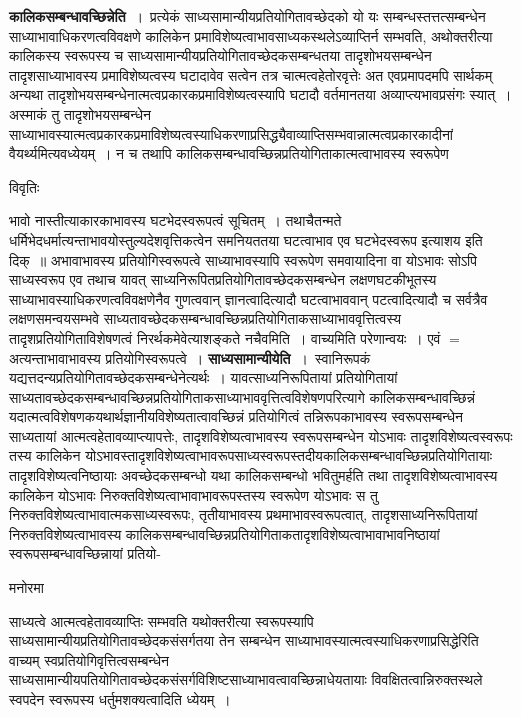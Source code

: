 \documentclass[10pt, openany]{book}
\begin{document}
{\textbf {\qt कालिकसम्बन्धावच्छिन्नेति~}।~प्रत्येकं साध्यसामान्यीयप्रतियोगितावच्छेदको यो यः सम्बन्धस्तत्तत्सम्बन्धेन साध्याभावाधिकरणत्वविवक्षणे कालिकेन प्रमाविशेष्यत्वाभावसाध्यकस्थलेऽव्याप्तिर्न सम्भवति, अथोक्तरीत्या कालिकस्य स्वरूपस्य च साध्यसामान्यीयप्रतियोगितावच्छेदकसम्बन्धतया तादृशोभयसम्बन्धेन तादृशसाध्याभावस्य प्रमाविशेष्यत्वस्य घटादावेव सत्वेन तत्र चात्मत्वहेतोरवृत्तेः अत एवप्रमापदमपि सार्थकम् अन्यथा तादृशोभयसम्बन्धेनात्मत्वप्रकारकप्रमाविशेष्यत्वस्यापि घटादौ वर्तमानतया अव्याप्त्यभावप्रसंगः स्यात्~। अस्माकं तु तादृशोभयसम्बन्धेन साध्याभावस्यात्मत्वप्रकारकप्रमाविशेष्यत्वस्याधिकरणाप्रसिद्ध्यैवाव्याप्तिसम्भवान्नात्मत्वप्रकारकादीनां वैयर्थ्यमित्यवध्येयम्~। न च तथापि कालिकसम्बन्धावच्छिन्नप्रतियोगिताकात्मत्वाभावस्य स्वरूपेण
\newpage
\lfoot{}
\begin{center}     विवृतिः \end{center}
भावो नास्तीत्याकारकाभावस्य घटभेदस्वरूपत्वं सूचितम्~। तथाचैतन्मते धर्मिभेदधर्मात्यन्ताभावयोस्तुल्यदेशवृत्तिकत्वेन समनियततया घटत्वाभाव एव घटभेदस्वरूप इत्याशय इति दिक्~॥ अभावाभावस्य प्रतियोगिस्वरूपत्वे साध्याभावस्यापि स्वरूपेण समवायादिना वा योऽभावः सोऽपि साध्यस्वरूप एव तथाच यावत् साध्यनिरूपितप्रतियोगितावच्छेदकसम्बन्धेन लक्षणघटकीभूतस्य साध्याभावस्याधिकरणत्वविवक्षणेनैव गुणत्ववान् ज्ञानत्वादित्यादौ घटत्वाभाववान् पटत्वादित्यादौ च सर्वत्रैव लक्षणसमन्वयसम्भवे साध्यतावच्छेदकसम्बन्धावच्छिन्नप्रतियोगिताकसाध्याभाववृत्तित्वस्य तादृशप्रतियोगिताविशेषणत्वं निरर्थकमेवेत्याशङ्कते नचैवमिति~। वाच्यमिति परेणान्वयः~। एवं $=$ अत्यन्ताभावाभावस्य प्रतियोगिस्वरूपत्वे~। \textbf {\qt साध्यसामान्यीयेति~}।~स्वानिरूपकं यद्यत्तदन्यप्रतियोगितावच्छेदकसम्बन्धेनेत्यर्थः~। यावत्साध्यनिरूपितायां प्रतियोगितायां साध्यतावच्छेदकसम्बन्धावच्छिन्नप्रतियोगिताकसाध्याभाववृत्तित्वविशेषणपरित्यागे कालिकसम्बन्धावच्छिन्नं यदात्मत्वविशेषणकयथार्थज्ञानीयविशेष्यतात्वावच्छिन्नं प्रतियोगित्वं तन्निरूपकाभावस्य स्वरूपसम्बन्धेन साध्यतायां आत्मत्वहेतावव्याप्त्यापत्तेः, तादृशविशेष्यत्वाभावस्य स्वरूपसम्बन्धेन योऽभावः तादृशविशेष्यत्वस्वरूपः तस्य कालिकेन योऽभावस्तादृशविशेष्यत्वाभावरूपसाध्यस्वरूपस्तदीयकालिकसम्बन्धावच्छिन्नप्रतियोगितायाः तादृशविशेष्यत्वनिष्ठायाः अवच्छेदकसम्बन्धो यथा कालिकसम्बन्धो भवितुमर्हति तथा तादृशविशेष्यत्वाभावस्य कालिकेन योऽभावः निरुक्तविशेष्यत्वाभावाभावरूपस्तस्य स्वरूपेण योऽभावः स तु निरुक्तविशेष्यत्वाभावात्मकसाध्यस्वरूपः, तृतीयाभावस्य प्रथमाभावस्वरूपत्वात्, तादृशसाध्यनिरूपितायां निरुक्तविशेष्यत्वाभावस्य
कालिकसम्बन्धावच्छिन्नप्रतियोगिताकतादृशविशेष्यत्वाभावाभावनिष्ठायां स्वरूपसम्बन्धावच्छिन्नायां प्रतियो-
\begin{center}   मनोरमा  \end{center}
साध्यत्वे आत्मत्वहेतावव्याप्तिः सम्भवति यथोक्तरीत्या स्वरूपस्यापि साध्यसामान्यीयप्रतियोगितावच्छेदकसंसर्गतया तेन सम्बन्धेन साध्याभावस्यात्मत्वस्याधिकरणाप्रसिद्धेरिति वाच्यम् स्वप्रतियोगिवृत्तित्वसम्बन्धेन साध्यसामान्यीयपतियोगितावच्छेदकसंसर्गविशिष्टसाध्याभावत्वावच्छिन्नाधेयतायाः विवक्षितत्वान्निरुक्तस्थले स्वपदेन स्वरूपस्य धर्तुमशक्यत्वादिति
ध्येयम्~।\\

}
\end{document}
